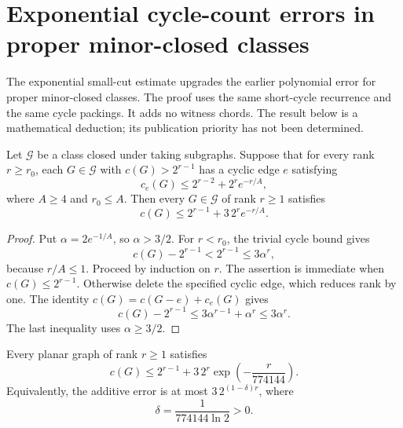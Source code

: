 \section{Exponential cycle-count errors in proper minor-closed classes}
\label{sec:minor-exponential-error}

The exponential small-cut estimate upgrades the earlier polynomial error for proper minor-closed classes.
The proof uses the same short-cycle recurrence and the same cycle packings.
It adds no witness chords.
The result below is a mathematical deduction; its publication priority has not been determined.

\begin{lemma}
\label{lem:exponential-edge-recurrence}
Let $\mathcal G$ be a class closed under taking subgraphs.
Suppose that for every rank $r\ge r_0$, each $G\in\mathcal G$ with $c(G)>2^{r-1}$ has a cyclic edge $e$ satisfying
\[
 c_e(G)\le 2^{r-2}+2^r e^{-r/A},
\]
where $A\ge4$ and $r_0\le A$.
Then every $G\in\mathcal G$ of rank $r\ge1$ satisfies
\[
 c(G)\le 2^{r-1}+3\,2^r e^{-r/A}.
\]
\end{lemma}

\begin{proof}
Put $\alpha=2e^{-1/A}$, so $\alpha>3/2$.
For $r<r_0$, the trivial cycle bound gives
\[
 c(G)-2^{r-1}<2^{r-1}\le3\alpha^r,
\]
because $r/A\le1$.
Proceed by induction on $r$.
The assertion is immediate when $c(G)\le2^{r-1}$.
Otherwise delete the specified cyclic edge, which reduces rank by one.
The identity $c(G)=c(G-e)+c_e(G)$ gives
\[
 c(G)-2^{r-1}\le3\alpha^{r-1}+\alpha^r\le3\alpha^r.
\]
The last inequality uses $\alpha\ge3/2$.
\end{proof}

\begin{theorem}
\label{thm:planar-exponential-error}
Every planar graph of rank $r\ge1$ satisfies
\[
 c(G)\le2^{r-1}+3\,2^r\exp\!\left(-\frac{r}{774144}\right).
\]
Equivalently, the additive error is at most $3\,2^{(1-\delta)r}$, where
\[
 \delta=\frac1{774144\ln2}>0.
\]
\end{theorem}


